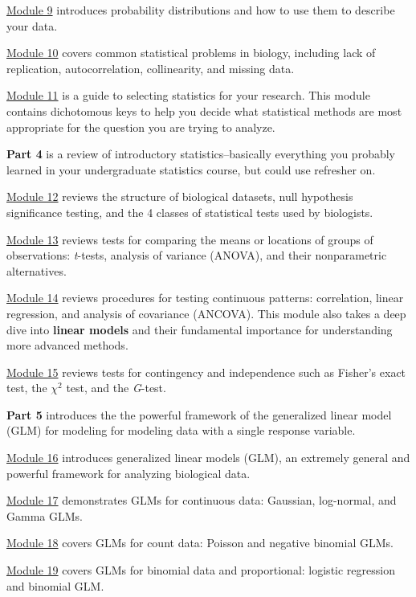 \documentclass[
  13,
  letterpaper,
]{report}
\begin{document}
\hyperref[sec-09]{Module 9} introduces probability distributions and how
to use them to describe your data.

\hyperref[sec-10]{Module 10} covers common statistical problems in
biology, including lack of replication, autocorrelation, collinearity,
and missing data.

\hyperref[sec-11]{Module 11} is a guide to selecting statistics for your
research. This module contains dichotomous keys to help you decide what
statistical methods are most appropriate for the question you are trying
to analyze.

\textbf{Part 4} is a review of introductory statistics--basically
everything you probably learned in your undergraduate statistics course,
but could use refresher on.

\hyperref[sec-12]{Module 12} reviews the structure of biological
datasets, null hypothesis significance testing, and the 4 classes of
statistical tests used by biologists.

\hyperref[sec-13]{Module 13} reviews tests for comparing the means or
locations of groups of observations: \emph{t}-tests, analysis of
variance (ANOVA), and their nonparametric alternatives.

\hyperref[sec-14]{Module 14} reviews procedures for testing continuous
patterns: correlation, linear regression, and analysis of covariance
(ANCOVA). This module also takes a deep dive into \textbf{linear models}
and their fundamental importance for understanding more advanced
methods.

\hyperref[sec-15]{Module 15} reviews tests for contingency and
independence such as Fisher's exact test, the \(\chi^2\) test, and the
\emph{G}-test.

\textbf{Part 5} introduces the the powerful framework of the generalized
linear model (GLM) for modeling for modeling data with a single response
variable.

\hyperref[sec-16]{Module 16} introduces generalized linear models (GLM),
an extremely general and powerful framework for analyzing biological
data.

\hyperref[sec-17]{Module 17} demonstrates GLMs for continuous data:
Gaussian, log-normal, and Gamma GLMs.

\hyperref[sec-18]{Module 18} covers GLMs for count data: Poisson and
negative binomial GLMs.

\hyperref[sec-19]{Module 19} covers GLMs for binomial data and
proportional: logistic regression and binomial GLM.
\end{document}

